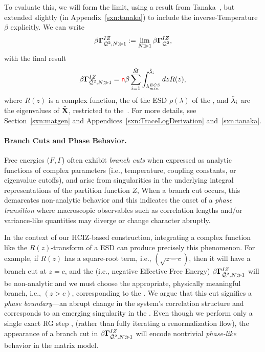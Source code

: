 To evaluate this, we will form the \LargeN limit, using a result from Tanaka~\cite{Tanaka2007,Tanaka2008},
but extended slightly (in Appendix~\ref{sxn:tanaka}) to include the inverse-Temperature $\beta$ explicitly.
We can write
\begin{align}
  \label{eqn:izgin_def}
  \beta\mathbf{\Gamma}^{IZ}_{\bar{\mathcal{Q}}^{2},N\gg 1}:=\lim_{N\gg 1}\beta\mathbf{\Gamma}^{IZ}_{\bar{\mathcal{Q}}^{2}} ,
\end{align}
with the final result
  \begin{align}
    \label{eqn:hciz_tanaka}
    \beta\mathbf{\Gamma}^{IZ}_{\bar{\mathcal{Q}}^{2},N\gg 1}={\color{red}\sf{n}}\beta\sum_{i=1}^{\tilde{M}}\int^{\tilde{\lambda}_{i}}_{\lambda^{ECS}_{min}} dz R(z) ,
\end{align}
where $R(z)$ is a complex function, the \RTransform of the ESD $\rho(\lambda)$ of the \Teacher, and $\tilde{\lambda}_{i}$ are the eigenvalues of \Teacher \CorrelationMatrix $\tilde{\mathbf{X}}$, restricted to the~\ECS.
For more details, see Section~\ref{sxn:matgen} and Appendices~\ref{sxn:TraceLogDerivation} and~\ref{sxn:tanaka}.

\paragraph{Branch Cuts and Phase Behavior.}
Free energies ($F,\Gamma$)  often exhibit \emph{branch cuts} when expressed as analytic functions 
of complex parameters (i.e., temperature, coupling constants, or eigenvalue cutoffs),
and arise from singularities in the underlying integral representations of the partition function $Z$,
When a branch cut occurs, this demarcates non-analytic behavior
and this indicates the onset of a \emph{phase transition} where
macroscopic observables such as correlation lengths and/or variance-like quantities
may diverge or change character abruptly.  

In the context of our HCIZ-based construction, integrating a complex function like the $R(z)$-transform of
a \HeavyTailed ESD can produce precisely this phenomenon.
For example, if $R(z)$ has a square-root term, i.e., $(\sqrt{z-c})$, then it will have a branch cut at $z=c$,
and the \GeneratingFunction (i.e.,  negative Effective Free Energy) $\beta\mathbf{\Gamma}^{IZ}_{\bar{\mathcal{Q}}^{2},N\gg 1}$
will be non-analytic and we must choose the appropriate, physically meaningful branch, i.e., $(z>c)$,
corresponding to the \ECS.
We argue that this cut signifies a \emph{phase boundary}—an abrupt change
in the system’s correlation structure and corresponds to an emerging singularity in the \LayerQuality.
Even though we perform only a single exact RG step , 
(rather than fully iterating a renormalization flow), the appearance of a branch cut in $\beta\mathbf{\Gamma}^{IZ}_{\bar{\mathcal{Q}}^{2},N\gg 1}$ will encode
nontrivial \emph{phase-like} behavior in the \SETOL \HeavyTailed matrix model.




